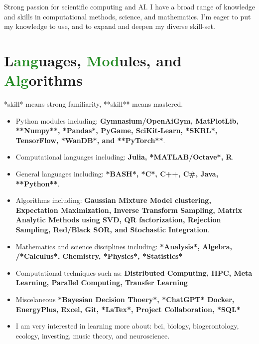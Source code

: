 \documentclass[letterpaper]{twentysecondcv} %
\begin{document}
\makeprofile %


Strong passion for scientific computing and AI. I have a broad range of knowledge and skills in computational methods, science, and mathematics. I'm eager to put my knowledge to use, and to expand and deepen my diverse skill-set.

\section{L\textcolor{ForestGreen}{ang}uages, \textcolor{ForestGreen}{Mod}ules, and \textcolor{ForestGreen}{Alg}orithms}
*skill* means strong familiarity, **skill** means mastered.
\begin{itemize}
\item Python modules including: \textbf{Gymnasium/OpenAiGym, MatPlotLib, **Numpy**, *Pandas*, PyGame, SciKit-Learn, *SKRL*, TensorFlow, *WanDB*, and **PyTorch**}.
\item Computational languages including: \textbf{Julia, *MATLAB/Octave*, R}.
\item General languages including: \textbf{*BASH*, *C*, C++, C\#, Java, **Python**}.
\item Algorithms including: \textbf{Gaussian Mixture Model clustering, Expectation Maximization, Inverse Transform Sampling, Matrix Analytic Methods using SVD, QR factorization, Rejection Sampling, Red/Black SOR, and Stochastic Integration}.
\item Mathematics and science disciplines including: \textbf{*Analysis*, Algebra, /*Calculus*, Chemistry, *Physics*, *Statistics*}
\item Computational techniques such as: \textbf{Distributed Computing, HPC, Meta Learning, Parallel Computing, Transfer Learning}
\item Miscelaneous \textbf{*Bayesian Decision Thoery*, *ChatGPT* Docker, EnergyPlus, Excel, Git, *LaTex*, Project Collaboration, *SQL*}
\end{itemize}
\begin{itemize}
\item I am very interested in learning more about: bci, biology, biogerontology, ecology, investing, music theory, and neuroscience. 
\end{itemize}
\end{document}
